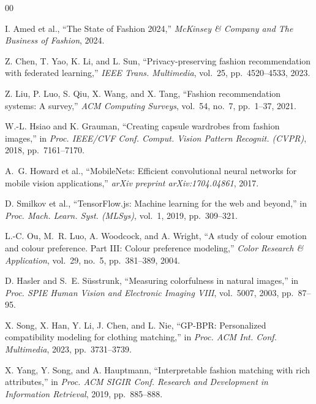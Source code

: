 \documentclass[conference]{IEEEtran}
\begin{document}
\begin{thebibliography}{00}

I. Amed et al., ``The State of Fashion 2024,'' \textit{McKinsey \& Company and The Business of Fashion}, 2024.

Z. Chen, T. Yao, K. Li, and L. Sun, ``Privacy-preserving fashion recommendation with federated learning,'' \textit{IEEE Trans. Multimedia}, vol.~25, pp.~4520--4533, 2023.

Z. Liu, P. Luo, S. Qiu, X. Wang, and X. Tang, ``Fashion recommendation systems: A survey,'' \textit{ACM Computing Surveys}, vol.~54, no.~7, pp.~1--37, 2021.

W.-L. Hsiao and K. Grauman, ``Creating capsule wardrobes from fashion images,'' in \textit{Proc. IEEE/CVF Conf. Comput. Vision Pattern Recognit. (CVPR)}, 2018, pp.~7161--7170.

A.~G. Howard et al., ``MobileNets: Efficient convolutional neural networks for mobile vision applications,'' \textit{arXiv preprint arXiv:1704.04861}, 2017.

D. Smilkov et al., ``TensorFlow.js: Machine learning for the web and beyond,'' in \textit{Proc. Mach. Learn. Syst. (MLSys)}, vol.~1, 2019, pp.~309--321.

L.-C. Ou, M.~R. Luo, A. Woodcock, and A. Wright, ``A study of colour emotion and colour preference. Part III: Colour preference modeling,'' \textit{Color Research \& Application}, vol.~29, no.~5, pp.~381--389, 2004.

D. Hasler and S.~E. S\"{u}sstrunk, ``Measuring colorfulness in natural images,'' in \textit{Proc. SPIE Human Vision and Electronic Imaging VIII}, vol.~5007, 2003, pp.~87--95.

X. Song, X. Han, Y. Li, J. Chen, and L. Nie, ``GP-BPR: Personalized compatibility modeling for clothing matching,'' in \textit{Proc. ACM Int. Conf. Multimedia}, 2023, pp.~3731--3739.

X. Yang, Y. Song, and A. Hauptmann, ``Interpretable fashion matching with rich attributes,'' in \textit{Proc. ACM SIGIR Conf. Research and Development in Information Retrieval}, 2019, pp.~885--888.

\end{thebibliography}
\end{document}
